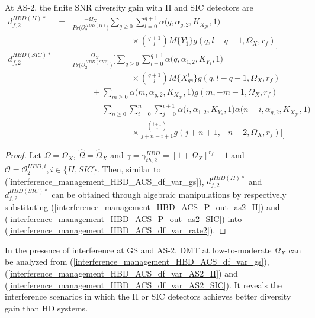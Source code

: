 \begin{proposition}
At AS-2, the finite SNR diversity gain with II and SIC detectors are
\begin{eqnarray} 
d_{f,2}^{HBD(II)*} & = & \frac{-\Omega_X}{Pr\big(\mathcal{O}_{2}^{HBD(II)}\big)} \sum_{q\geq0} \sum_{l=0}^{q+1} \alpha\big(q,\alpha_{g,2}, K_{X_{gs}}, 1\big) \nonumber \\
 & & \hspace{3cm} \times \binom{q+1}{l} M\{Y_1^l\} g(q,l-q-1,\Omega_X,r_f)_, \label{interference_management_HBD_ACS_df_var_AS2_II} \\
d_{f,2}^{HBD(SIC)*} & = & \frac{-\Omega_X}{Pr\big(\mathcal{O}_{2}^{HBD(SIC)}\big)} \Bigg[ \sum_{q\geq0}\sum_{l=0}^{q+1} \alpha\big(q,\alpha_{1,2},K_{Y_{1}},1\big) \nonumber \\
 & & \hspace{3cm} \times \binom{q+1}{l} M\{X_{gs}^l\} g(q,l-q-1,\Omega_X,r_f) \nonumber\\
 & & \hspace{1cm} + \sum_{m\geq0} \alpha\big(m,\alpha_{g,2},K_{X_{gs}},1\big) g(m,-m-1,\Omega_X,r_f) \nonumber \\
 & & \hspace{1cm} - \sum_{n\geq0}\sum_{i=0}^{n}\sum_{j=0}^{i+1} \alpha\big(i,\alpha_{1,2},K_{Y_{1}},1\big) \alpha\big(n-i,\alpha_{g,2},K_{X_{gs}},1\big) \nonumber\\
 & & \hspace{3cm} \times \frac{\binom{i+1}{j}}{j+n-i+1} g(j+n+1,-n-2,\Omega_X,r_f) \Bigg]_. \label{interference_management_HBD_ACS_df_var_AS2_SIC}
\end{eqnarray}
\end{proposition}
\begin{proof}
Let $\Omega=\Omega_X$, $\widehat{\Omega}=\widehat{\Omega}_X$ and $\gamma=\gamma_{th,2}^{HBD}=[1+\Omega_X]^{r_f}-1$ and $\mathcal{O} = \mathcal{O}_{2}^{HBD,i}, i \in \{II,SIC\}$. Then, similar to (\ref{interference_management_HBD_ACS_df_var_gs}), $d_{f,2}^{HBD(II)*}$ and $d_{f,2}^{HBD(SIC)*}$ can be obtained through algebraic manipulations by respectively substituting (\ref{interference_management_HBD_ACS_P_out_as2_II}) and (\ref{interference_management_HBD_ACS_P_out_as2_SIC}) into (\ref{interference_management_HBD_ACS_df_var_rate2}). 
\end{proof}

In the presence of interference at GS and AS-2, DMT at low-to-moderate $\Omega_X$ can be analyzed from (\ref{interference_management_HBD_ACS_df_var_gs}), (\ref{interference_management_HBD_ACS_df_var_AS2_II}) and (\ref{interference_management_HBD_ACS_df_var_AS2_SIC}). It reveals the interference scenarios in which the II or SIC detectors achieves better diversity gain than HD systems.

